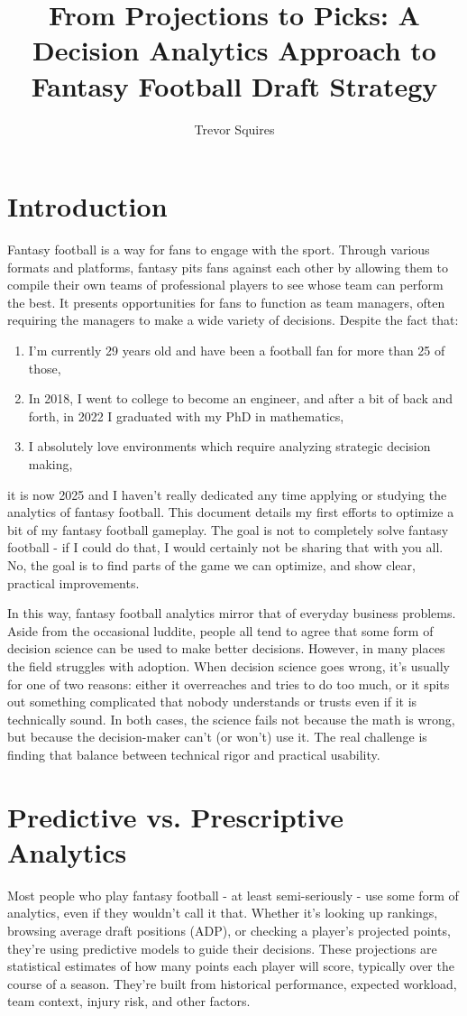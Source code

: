 \documentclass{article}
\title{From Projections to Picks: A Decision Analytics Approach to Fantasy Football Draft Strategy}
\author{Trevor Squires}
\begin{document}
\maketitle

\section{Introduction}
Fantasy football is a way for fans to engage with the sport.
Through various formats and platforms, fantasy pits fans against each other by allowing them to compile their own teams of professional players to see whose team can perform the best.
It presents opportunities for fans to function as team managers, often requiring the managers to make a wide variety of decisions.
Despite the fact that:
\begin{enumerate}
  \item I'm currently 29 years old and have been a football fan for more than 25 of those,
  \item In 2018, I went to college to become an engineer, and after a bit of back and forth, in 2022 I graduated with my PhD in mathematics,
  \item I absolutely love environments which require analyzing strategic decision making,
\end{enumerate}
it is now 2025 and I haven't really dedicated any time applying or studying the analytics of fantasy football.
This document details my first efforts to optimize a bit of my fantasy football gameplay.
The goal is not to completely solve fantasy football - if I could do that, I would certainly not be sharing that with you all.
No, the goal is to find parts of the game we can optimize, and show clear, practical improvements.

In this way, fantasy football analytics mirror that of everyday business problems.
Aside from the occasional luddite, people all tend to agree that some form of decision science can be used to make better decisions.
However, in many places the field struggles with adoption.
When decision science goes wrong, it's usually for one of two reasons: either it overreaches and tries to do too much, or it spits out something complicated that nobody understands or trusts even if it is technically sound.
In both cases, the science fails not because the math is wrong, but because the decision-maker can't (or won't) use it.
The real challenge is finding that balance between technical rigor and practical usability.


\section{Predictive vs. Prescriptive Analytics}
Most people who play fantasy football - at least semi-seriously - use some form of analytics, even if they wouldn't call it that.
Whether it's looking up rankings, browsing average draft positions (ADP), or checking a player's projected points, they're using predictive models to guide their decisions.
These projections are statistical estimates of how many points each player will score, typically over the course of a season.
They're built from historical performance, expected workload, team context, injury risk, and other factors.
\end{document}
